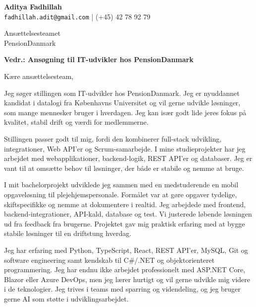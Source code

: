 \documentclass[a4paper,12pt]{article}
\begin{document}

\begin{center}
{\Large \textbf{Aditya Fadhillah}}\\
\texttt{fadhillah.adit@gmail.com} \quad | \quad (+45) 42 78 92 79
\end{center}

\vspace{0.4cm}

\noindent Ansættelsesteamet\\
PensionDanmark

\vspace{0.5cm}

\noindent \textbf{Vedr.: Ansøgning til IT-udvikler hos PensionDanmark}

\vspace{0.4cm}

\noindent Kære ansættelsesteam,

\vspace{0.2cm}

\noindent
Jeg søger stillingen som IT-udvikler hos PensionDanmark. Jeg er nyuddannet kandidat i datalogi fra Københavns Universitet og vil gerne udvikle løsninger, som mange mennesker bruger i hverdagen. Jeg kan især godt lide jeres fokus på kvalitet, stabil drift og værdi for medlemmerne.

\vspace{0.2cm}

\noindent
Stillingen passer godt til mig, fordi den kombinerer full-stack udvikling, integrationer, Web API'er og Scrum-samarbejde. I mine studieprojekter har jeg arbejdet med webapplikationer, backend-logik, REST API'er og databaser. Jeg er vant til at omsætte behov til løsninger, der både er stabile og nemme at bruge.

\vspace{0.2cm}

\noindent
I mit bachelorprojekt udviklede jeg sammen med en medstuderende en mobil opgaveløsning til plejehjemspersonale. Formålet var at gøre opgaver tydelige, skiftspecifikke og nemme at dokumentere i realtid. Jeg arbejdede med frontend, backend-integrationer, API-kald, database og test. Vi justerede løbende løsningen ud fra feedback fra brugerne. Projektet gav mig praktisk erfaring med at bygge stabile løsninger til en driftstung hverdag.

\vspace{0.2cm}

\noindent
Jeg har erfaring med Python, TypeScript, React, REST API'er, MySQL, Git og software engineering samt kendskab til C\#/.NET og objektorienteret programmering. Jeg har endnu ikke arbejdet professionelt med ASP.NET Core, Blazor eller Azure DevOps, men jeg lærer hurtigt og vil gerne udvikle mig videre i de teknologier. Jeg trives i teams med sparring og videndeling, og jeg bruger gerne AI som støtte i udviklingsarbejdet.
\end{document}
